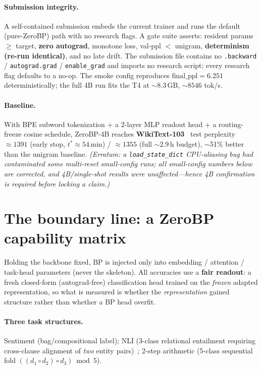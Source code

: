 \documentclass[11pt]{article}
\newcommand{\zbp}{ZeroBP-4B}
\begin{document}
\paragraph{Submission integrity.} A self-contained submission embeds the current trainer and runs the
default (pure-ZeroBP) path with no research flags. A gate suite asserts: resident params $\ge$ target,
\textbf{zero autograd}, monotone loss, val-ppl $<$ unigram, \textbf{determinism (re-run identical)}, and no
late drift. The submission file contains no \texttt{.backward} / \texttt{autograd.grad} / \texttt{enable\_grad}
and imports no research script; every research flag defaults to a no-op. The smoke config reproduces
$\text{final\_ppl}=6.251$ deterministically; the full 4B run fits the T4 at ${\sim}8.3$\,GB, ${\sim}8546$
tok/s.

\paragraph{Baseline.} With BPE subword tokenization + a 2-layer MLP readout head + a routing-freeze cosine
schedule, \zbp{} reaches \textbf{WikiText-103}~\cite{merity2017wikitext} test perplexity $\approx 1391$
(early stop, $t^{*} \approx 54$\,min) / $\approx 1355$ (full ${\sim}2.9$\,h budget), $\sim$51\% better than
the unigram baseline. \emph{(Erratum: a \texttt{load\_state\_dict} CPU-aliasing bug had contaminated some
multi-reset small-config runs; all small-config numbers below are corrected, and 4B/single-shot results were
unaffected---hence 4B confirmation is required before locking a claim.)}

\section{The boundary line: a ZeroBP capability matrix}
\label{sec:boundary}

Holding the backbone fixed, BP is injected only into embedding / attention / task-head parameters (never the
skeleton). All accuracies use a \textbf{fair readout}: a fresh closed-form (autograd-free) classification
head trained on the \emph{frozen} adapted representation, so what is measured is whether the
\emph{representation} gained structure rather than whether a BP head overfit.

\paragraph{Three task structures.} Sentiment (bag/compositional label); NLI (3-class relational entailment
requiring cross-clause alignment of \emph{two} entity pairs)~\cite{bowman2015snli}; 2-step arithmetic
(5-class sequential fold $((d_1 \circ d_2) \circ d_3) \bmod 5$).
\end{document}
